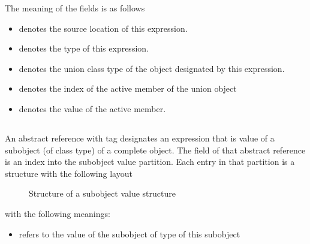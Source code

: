 The meaning of the fields is as follows
\begin{itemize}
	\item {} denotes the source location of this expression.
	\item {} denotes the type of this expression.
	\item {} denotes the union class type of the object designated by this expression.
	\item {} denotes the index of the active member of the union object
	\item {} denotes the value of the active member.
\end{itemize}




\subsection{}
\label{sec:ifc:ExprSort:SubobjectValue}

An  abstract reference with tag  designates 
an expression that is value of a subobject (of class type) of a complete object.
The  field of that abstract reference is an index into the subobject value partition.
Each entry in that partition is a structure with the following layout
%
\begin{figure}[H]
	\centering
	\caption{Structure of a subobject value structure}
	\label{fig:ifc:ExprSort:SubobjectValue}
\end{figure}
%
with the following meanings:
\begin{itemize}
	\item {} refers to the value of the subobject of type of this subobject
\end{itemize}




\subsection{}
\label{sec:ifc:ExprSort:ArrayValue}

